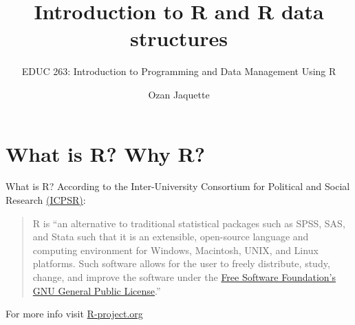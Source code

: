 \documentclass[
  8pt,
  ignorenonframetext,
  dvipsnames]{beamer}
\title{Introduction to R and R data structures}
\subtitle{EDUC 263: Introduction to Programming and Data Management
Using R}
\author{Ozan Jaquette}
\date{}
\begin{document}
\frame{\titlepage}

\begin{frame}[allowframebreaks]
  \tableofcontents[hideallsubsections]
\end{frame}
\hypertarget{what-is-r-why-r}{%
\section{What is R? Why R?}\label{what-is-r-why-r}}

\begin{frame}{What is R?}
\protect\hypertarget{what-is-r}{}
According to the Inter-University Consortium for Political and Social
Research
\href{https://www.icpsr.umich.edu/icpsrweb/content/shared/ICPSR/faqs/what-is-r.html}{(ICPSR)}:

\medskip

\begin{quote}
R is ``an alternative to traditional statistical packages such as SPSS,
SAS, and Stata such that it is an extensible, open-source language and
computing environment for Windows, Macintosh, UNIX, and Linux platforms.
Such software allows for the user to freely distribute, study, change,
and improve the software under the
\href{https://www.gnu.org/home.en.html}{Free Software Foundation's GNU
General Public License}.''
\end{quote}

\medskip

For more info visit
\href{https://www.r-project.org/about.html}{R-project.org}
\end{frame}
\end{document}
